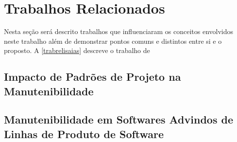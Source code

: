 \chapter{Trabalhos Relacionados}\label{trabalhorel}
Nesta seção será descrito trabalhos que influenciaram os conceitos envolvidos neste trabalho além de demonstrar pontos comuns e distintos entre si e o proposto. A \autoref{trabrelisaias} descreve o trabalho de 
\section{Impacto de Padrões de Projeto na Manutenibilidade} \label{trabrelisaias}
\section{Manutenibilidade em Softwares Advindos de Linhas de Produto de Software} \label{trabrelgustavo}